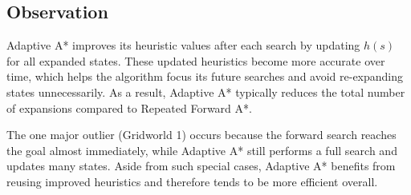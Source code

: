 \documentclass[12pt]{article}
\begin{document}
\subsection*{Observation}

Adaptive A* improves its heuristic values after each search by updating $h(s)$ for all expanded
states. These updated heuristics become more accurate over time, which helps the algorithm focus its
future searches and avoid re-expanding states unnecessarily. As a result, Adaptive A* typically
reduces the total number of expansions compared to Repeated Forward A*.

The one major outlier (Gridworld 1) occurs because the forward search reaches the goal almost
immediately, while Adaptive A* still performs a full search and updates many states. Aside from such
special cases, Adaptive A* benefits from reusing improved heuristics and therefore tends to be more
efficient overall.
\end{document}

